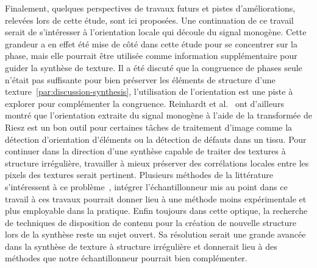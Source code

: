 \bigskip

Finalement, quelques perspectives de travaux futurs et pistes d'améliorations, relevées lors de cette étude, sont ici proposées. Une continuation de ce travail serait de s'intéresser à l'orientation locale qui découle du signal monogène. Cette grandeur a en effet été mise de côté dans cette étude pour se concentrer sur la phase, mais elle pourrait être utilisée comme information supplémentaire pour guider la synthèse de texture. Il a été discuté que la congruence de phases seule n'était pas suffisante pour bien préserver les éléments de structure d'une texture~\ref{par:discussion-synthesis}, l'utilisation de l'orientation est une piste à explorer pour complémenter la congruence. Reinhardt et al.~\cite{reinhardt_multi-scale_2022} ont d'ailleurs montré que l'orientation extraite du signal monogène à l'aide de la transformée de Riesz est un bon outil pour certaines tâches de traitement d'image comme la détection d'orientation d'éléments ou la détection de défauts dans un tissu. Pour continuer dans la direction d'une synthèse capable de traiter des textures à structure irrégulière, travailler à mieux préserver des corrélations locales entre les pixels des textures serait pertinent. Plusieurs méthodes de la littérature s'intéressent à ce problème~\cite{heitz_high-performance_2018, cavalier_local_2019}, intégrer l'échantillonneur mis au point dans ce travail à ces travaux pourrait donner lieu à une méthode moins expérimentale et plus employable dans la pratique. Enfin toujours dans cette optique, la recherche de techniques de disposition de contenu pour la création de nouvelle structure lors de la synthèse reste un sujet ouvert. Sa résolution serait une grande avancée dans la synthèse de texture à structure irrégulière et donnerait lieu à des méthodes que notre échantillonneur pourrait bien complémenter.


